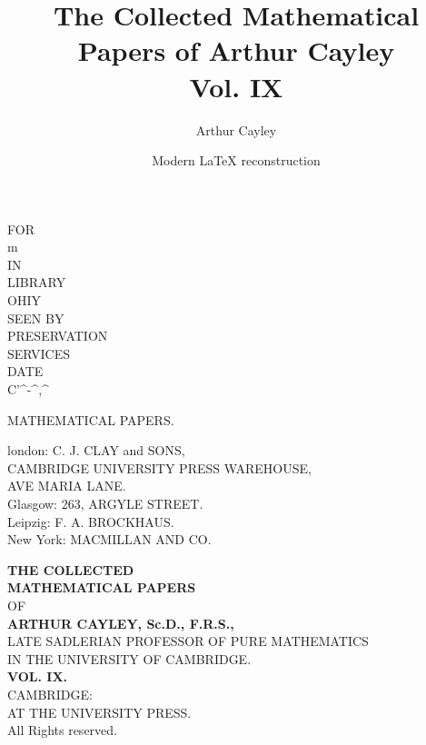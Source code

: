 \documentclass[11pt,a4paper]{book}
\title{The Collected Mathematical Papers of Arthur Cayley\\Vol. IX}
\author{Arthur Cayley}
\date{Modern \LaTeX{} reconstruction}
\begin{document}
\maketitle



\thispagestyle{empty}

\begin{center}

\vspace*{2cm}

{\Large FOR}\\[8pt]
{\large m}\\[8pt]
{\Large IN}\\[8pt]
{\Large LIBRARY}\\[8pt]
{\Large OHIY}\\[12pt]
{\large SEEN BY}\\[8pt]
{\Large PRESERVATION}\\[8pt]
{\Large SERVICES}\\[8pt]
{\large DATE}\\[16pt]
{\Large C'\^{}-\^{},\^{}}

\vfill
\newpage

{\Large MATHEMATICAL PAPERS.}

\vfill
\newpage

{\Large london: C. J. CLAY and SONS,}\\[6pt]
\normalsize CAMBRIDGE UNIVERSITY PRESS WAREHOUSE,\\
AVE MARIA LANE.\\[6pt]
Glasgow: 263, ARGYLE STREET.\\[6pt]
Leipzig: F. A. BROCKHAUS.\\[6pt]
New York: MACMILLAN AND CO.

\vfill
\newpage

\vspace*{3cm}

{\Large \textbf{THE COLLECTED}}\\[8pt]
{\Large \textbf{MATHEMATICAL PAPERS}}\\[12pt]
{\large OF}\\[12pt]
{\Large \textbf{ARTHUR CAYLEY, Sc.D., F.R.S.,}}\\[8pt]
\normalsize LATE SADLERIAN PROFESSOR OF PURE MATHEMATICS\\
IN THE UNIVERSITY OF CAMBRIDGE.\\[20pt]
{\Large \textbf{VOL. IX.}}\\[30pt]
{\Large CAMBRIDGE:}\\[6pt]
{\large AT THE UNIVERSITY PRESS.}\\[12pt]
{\small All Rights reserved.}


\end{center}
\end{document}
